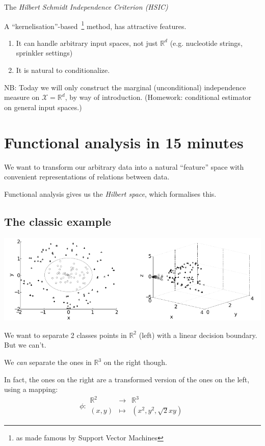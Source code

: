 The \emph{Hilbert Schmidt Independence Criterion (HSIC)}

A ``kernelisation''-based~\footnote{as made famous by Support Vector Machines} method, has attractive features.
\begin{enumerate}
\item It can handle arbitrary input spaces, not just $\mathbb{R}^d$ (e.g. nucleotide strings, sprinkler settings)
\item It is natural to conditionalize.
\end{enumerate}
\clearpage
NB: Today we will only construct the marginal (unconditional) independence measure on $\mathcal{X}=\mathbb{R}^d$, by way of introduction. (Homework: conditional estimator on general input spaces.)

\clearpage
\section{Functional analysis in 15 minutes}
We want to transform our arbitrary data into a natural ``feature'' space with convenient representations of relations between data.

Functional analysis gives us the \emph{Hilbert space}, which formalises this.

\clearpage
\subsection*{The classic example}

    \includegraphics[width=\textwidth]{diploma_separation_diagrams.pdf}
    
    We want to separate 2 classes points in $\mathbb{R}^2$ (left) with a linear decision boundary. But we can't.
    
    We \emph{can} separate the ones in $\mathbb{R}^3$ on the right though.
 
 \clearpage
In fact, the ones on the right are a transformed version of the ones on the left, using a mapping:
\begin{equation*}
	\phi: \begin{matrix}
		\mathbb{R}^2  &\rightarrow &\mathbb{R}^3\\
		(x,y) &\mapsto &\left(x^2, y^2, \sqrt{2}xy\right)
	\end{matrix}
\end{equation*}

